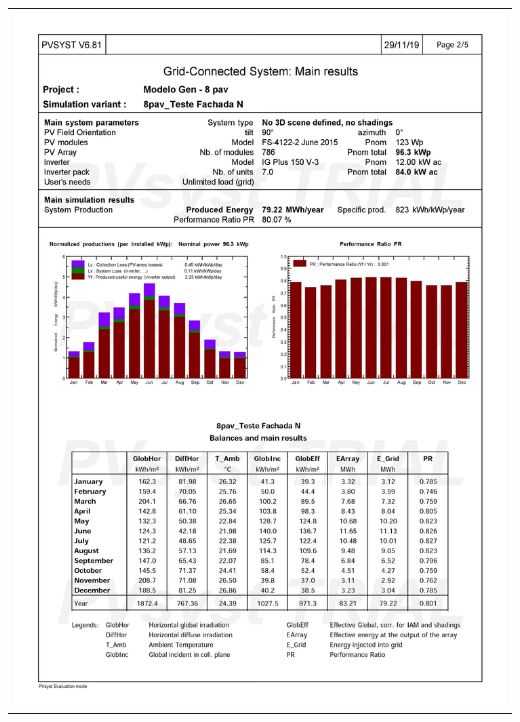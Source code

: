 \begin{table}[H]
    \centering
    \begin{tabular}{l}
        \includegraphics[width=\textwidth]{figures/attachments/resultpv6.jpg}
    \end{tabular}
\end{table}
\pagebreak
